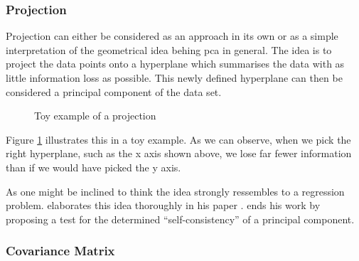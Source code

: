 \subsubsection{Projection}



Projection can either be considered as an approach in its own or as a simple interpretation of the geometrical idea behing \gls{pca} in general.
The idea is to project the data points onto a \gls{hyperplane} which summarises the data with as little information loss as possible.
This newly defined hyperplane can then be considered a principal component of the data set.


\renewcommand{\tikzscale}{0.4}
\begin{figure}[h]
	\centering
	
	\captionsetup{justification=centering}
	\vspace*{4mm}
	\caption{Toy example of a projection}
    \label{fig:projectionExample}
\end{figure}


Figure \ref{fig:projectionExample} illustrates this in a toy example.
As we can observe, when we pick the right \gls{hyperplane}, such as the x axis shown above, we lose far fewer information than if we would have picked the y axis.\bigskip


As one might be inclined to think the idea strongly ressembles to a regression problem. 
\citeauthor{tarpey1999self} elaborates this idea thoroughly in his paper  \cite{tarpey1999self}.
\citeauthor{tarpey1999self} ends his work by proposing a test for the determined ``self-consistency'' of a principal component.






\clearpage



\subsubsection{Covariance Matrix}

